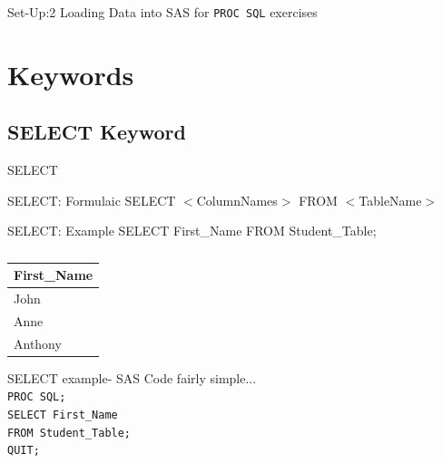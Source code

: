 \documentclass[handout]{beamer}
\begin{document}
	\begin{frame}{Set-Up:2}
		Loading Data into SAS for \texttt{PROC SQL} exercises
	\end{frame}
	
	\section{Keywords}
	
	\subsection{SELECT Keyword}
	\begin{frame}{SELECT}
		\begin{block}{SELECT: Formulaic}
			SELECT $<$ColumnNames$>$ FROM $<$TableName$>$ 
		\end{block}
		\begin{block}{SELECT: Example}
			SELECT First\_Name FROM Student\_Table;
		\end{block}
		\begin{table}[H]
			\centering
			\caption*{}
			
			\begin{tabular}{|l|}
				\hline
				First\_Name  \\ \hline
				John \\ \hline
				Anne  \\ \hline
				Anthony  \\    \hline
			\end{tabular}
		\end{table}			
	\end{frame}
	
	\begin{frame}{SELECT example- SAS}
		Code fairly simple... \\ \pause 
		\texttt{PROC SQL;} \\
		\texttt{SELECT First\_Name } \\
		\texttt{FROM Student\_Table;}\\
		\texttt{QUIT;}
	\end{frame}
	
\end{document}
